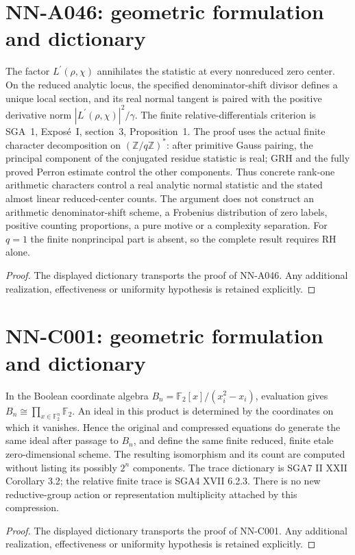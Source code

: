 \section{NN-A046: geometric formulation and dictionary}
\begin{geometricstatement}[NN-A046]
The factor $L^\prime(\rho,\chi)$ annihilates the statistic at every nonreduced zero center. On the reduced analytic locus, the specified denominator-shift divisor defines a unique local section, and its real normal tangent is paired with the positive derivative norm $|L^\prime(\rho,\chi)|^2/\gamma$. The finite relative-differentials criterion is SGA~1, Expos\'e~I, section~3, Proposition~1. The proof uses the actual finite character decomposition on $(\mathbb Z/q\mathbb Z)^*$: after primitive Gauss pairing, the principal component of the conjugated residue statistic is real; GRH and the fully proved Perron estimate control the other components. Thus concrete rank-one arithmetic characters control a real analytic normal statistic and the stated almost linear reduced-center counts. The argument does not construct an arithmetic denominator-shift scheme, a Frobenius distribution of zero labels, positive counting proportions, a pure motive or a complexity separation. For $q=1$ the finite nonprincipal part is absent, so the complete result requires RH alone.
\end{geometricstatement}
\begin{proof} The displayed dictionary transports the proof of NN-A046. Any additional realization, effectiveness or uniformity hypothesis is retained explicitly.\end{proof}


\section{NN-C001: geometric formulation and dictionary}
\begin{geometricstatement}[NN-C001]
In the Boolean coordinate algebra $B_n=\mathbb F_2[x]/(x_i^2-x_i)$, evaluation gives $B_n\cong\prod_{x\in\mathbb F_2^n}\mathbb F_2$. An ideal in this product is determined by the coordinates on which it vanishes. Hence the original and compressed equations do generate the same ideal after passage to $B_n$, and define the same finite reduced, finite etale zero-dimensional scheme. The resulting isomorphism and its count are computed without listing its possibly $2^n$ components. The trace dictionary is SGA7 II XXII Corollary 3.2; the relative finite trace is SGA4 XVII 6.2.3. There is no new reductive-group action or representation multiplicity attached by this compression.
\end{geometricstatement}
\begin{proof} The displayed dictionary transports the proof of NN-C001. Any additional realization, effectiveness or uniformity hypothesis is retained explicitly.\end{proof}


